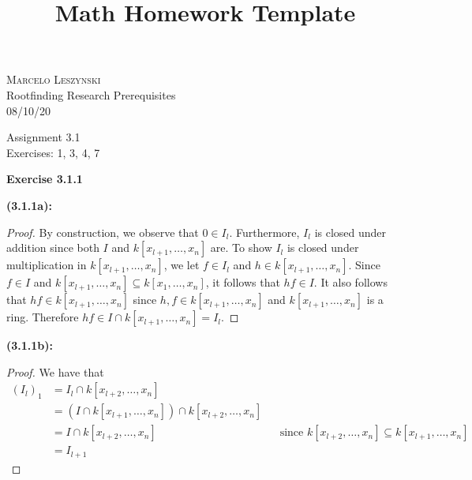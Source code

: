 \documentclass[12pt,oneside]{article}
\newenvironment{exercise}[1]{\vspace{.1in}\noindent\textbf{Exercise #1 \hspace{.05em}}}{}
\begin{document}
\title{Math Homework Template}

\begin{flushright}
\textsc{Marcelo Leszynski}  \\
Rootfinding Research Prerequisites\\
08/10/20
\end{flushright}

\begin{center}
\textsf{Assignment 3.1 } \\
\textsf{Exercises: 1, 3, 4, 7 }
\end{center}


\begin{exercise}{3.1.1}

    \bigskip
    \textbf{(3.1.1a):}
    \begin{proof}
        By construction, we observe that $0 \in I_l$. Furthermore, $I_l$ is closed under
        addition since both $I$ and $k[x_{l+1},\ldots,x_n]$ are. To show $I_l$ is closed 
        under multiplication in $k[x_{l+1},\ldots,x_n]$, we let $f \in I_l$ and 
        $h \in k[x_{l+1},\ldots,x_n]$. Since $f \in I$ and 
        $k[x_{l+1},\ldots,x_n] \subseteq k[x_1,\ldots,x_n]$, it follows that $hf \in I$.
        It also follows that $hf \in k[x_{l+1},\ldots,x_n]$ since $h,f \in k[x_{l+1},\ldots,x_n]$ and $k[x_{l+1},\ldots,x_n]$ is a ring. Therefore 
        $hf \in I \cap k[x_{l+1},\ldots,x_n] = I_l$.
    \end{proof}
    
    \bigskip
    \textbf{(3.1.1b):}
    \begin{proof}
        We have that 
        \begin{align*}
            (I_{l})_1   &= I_l \cap k[x_{l+2},\ldots,x_n]\\
                        &= (I \cap k[x_{l+1},\ldots,x_n])\cap k[x_{l+2},\ldots,x_n]\\
                        &= I \cap k[x_{l+2},\ldots,x_n] && \text{since }k[x_{l+2},\ldots,x_n] \subseteq k[x_{l+1},\ldots,x_n]\\
                        &= I_{l+1}
        \end{align*}
    \end{proof}
\end{exercise}

\end{document}
